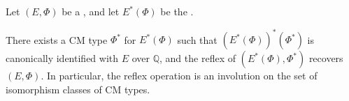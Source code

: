 \begin{proposition} \label{proposition:reflex_of_reflex_shimura_tate_duality_for_cm_types}
    Let $(E, \Phi)$ be a , and let $E^*(\Phi)$ be the .

    There exists a CM type $\Phi^*$ for $E^*(\Phi)$ such that $(E^*(\Phi))^*(\Phi^*)$ is canonically identified with $E$ over $\mathbb{Q}$, and the reflex of $(E^*(\Phi), \Phi^*)$ recovers $(E, \Phi)$. In particular, the reflex operation is an involution on the set of isomorphism classes of CM types.
\end{proposition}
